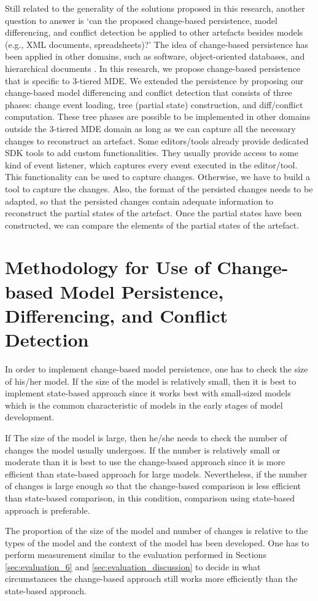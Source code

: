 Still related to the generality of the solutions proposed in this research, another question to answer is ‘can the proposed change-based persistence, model differencing, and conflict detection be applied to other artefacts besides models (e.g., XML documents, spreadsheets)?’ The idea of change-based persistence has been applied in other domains, such as software, object-oriented databases, and hierarchical documents \cite{DBLP:journals/entcs/RobbesL07,DBLP:conf/sde/LippeO92,DBLP:conf/caise/IgnatN05}. In this research, we propose change-based persistence that is specific to 3-tiered MDE. We extended the persistence by proposing our change-based model differencing and conflict detection that consists of three phases: change event loading, tree (partial state) construction, and diff/conflict computation. These tree phases are possible to be implemented in other domains outside the 3-tiered MDE domain as long as we can capture all the necessary changes to reconstruct an artefact. Some editors/tools already provide dedicated SDK tools to add custom functionalities. They usually provide access to some kind of event listener, which captures every event executed in the editor/tool. This functionality can be used to capture changes. Otherwise, we have to build a tool to capture the changes. Also, the format of the persisted changes needs to be adapted, so that the persisted changes contain adequate information to reconstruct the partial states of the artefact. Once the partial states have been constructed, we can compare the elements of the partial states of the artefact.

\section{Methodology for Use of Change-based Model Persistence, Differencing, and Conflict Detection}
\label{sec:methodology}
In order to implement change-based model persistence, one has to check the size of his/her model. If the size of the model is relatively small, then it is best to implement state-based approach since it works best with small-sized models which is the common characteristic of models in the early stages of model development. 

If The size of the model is large, then he/she needs to check the number of changes the model usually undergoes. If the number is relatively small or moderate than it is best to use the change-based approach since it is more efficient than state-based approach for large models. Nevertheless, if the number of changes is large enough so that the change-based comparison is less efficient than state-based comparison, in this condition, comparison using state-based approach is preferable.

The proportion of the size of the model and number of changes is relative to the types of the model and the context of the model has been developed. One has to perform measurement similar to the evaluation performed in Sections \ref{sec:evaluation_6} and \ref{sec:evaluation_discussion} to decide in what circumstances the change-based approach still works more efficiently than the state-based approach.
